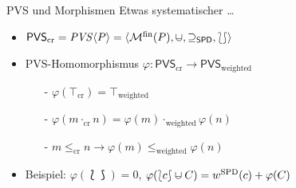 \begin{frame}{PVS und Morphismen} \small
Etwas systematischer \ldots 
\begin{itemize}
\item $\mathsf{PVS}_{\mathrm{cr}} = \mathit{PVS}\langle P \rangle = \langle \mathcal{M}^{\mathrm{fin}} (P), \mcup, \supseteq_{\mathsf{SPD}}, \lbag \rbag \rangle$
\item PVS-Homomorphismus $\varphi : \mathsf{PVS}_{\mathrm{cr}} \to  \mathsf{PVS}_{\mathrm{weighted}}$ \pause 
\begin{itemize}
\item[-] $\varphi(\top_{\mathrm{cr}}) = \top_{\mathrm{weighted}}$ \pause 
\item[-] $\varphi(m \cdot_{\mathrm{cr}} n) = \varphi(m) \cdot_{\mathrm{weighted}} \varphi(n)$ \pause 
\item[-] $m \leq_{\mathrm{cr}} n \rightarrow \varphi(m) \leq_{\mathrm{weighted}} \varphi(n)$ \pause 
\end{itemize}

\vspace*{2ex}

\item Beispiel: $\varphi(\lbag \rbag) = 0$, $\varphi(\lbag c\rbag \mcup C) = \SPDw{}(c) + \varphi(C)$

\vspace*{2ex}


\end{itemize}
\end{frame}
